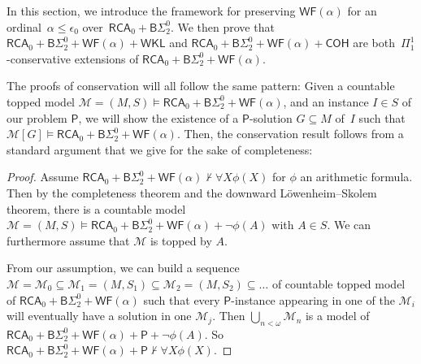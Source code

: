 \documentclass{article}
\newtheorem{theorem}{Theorem}
\numberwithin{theorem}{section}
\newtheorem{definition}[theorem]{Definition}
\newcommand{\quentin}[1]{\textcolor{green}{#1}}
\newcommand{\RCA}{\mathsf{RCA}}
\newcommand{\WKL}{\mathsf{WKL}}
\newcommand{\EM}{\mathsf{EM}}
\newcommand{\ADS}{\mathsf{ADS}}
\newcommand{\COH}{\mathsf{COH}}
\newcommand{\BSig}{\mathsf{B}\Sigma^0}
\newcommand{\WF}{\mathsf{WF}}
\newcommand{\RT}{\mathsf{RT}}
\newcommand{\M}{\mathcal{M}}
\newcommand{\NN}{\mathbb{N}}
\begin{document}
In this section, we introduce the framework for preserving $\WF(\alpha)$ for an ordinal~$\alpha \leq \epsilon_0$ over~$\RCA_0 + \BSig_2$. We then prove that $\RCA_0 + \BSig_2 + \WF(\alpha) + \WKL$ and $\RCA_0 + \BSig_2 + \WF(\alpha) + \COH$ are both~$\Pi^1_1$-conservative extensions of $\RCA_0 + \BSig_2 + \WF(\alpha)$.

The proofs of conservation will all follow the same pattern: Given a countable topped model  $\M = (M,S) \models \RCA_0 + \BSig_2 + \WF(\alpha)$, and an instance $I \in S$ of our problem $\mathsf{P}$, we will show the existence of a $\mathsf{P}$-solution $G \subseteq M$ of~$I$ such that $\M[G] \models \RCA_0 + \BSig_2 + \WF(\alpha)$. Then, the conservation result follows from a standard argument that we give for the sake of completeness:




\begin{proof}
Assume $\RCA_0 + \BSig_2 + \WF(\alpha) \not \vdash \forall X \phi(X)$ for $\phi$ an arithmetic formula. Then by the completeness theorem and the downward Löwenheim–Skolem theorem, there is a countable model $\M = (M,S) \models \RCA_0 + \BSig_2 + \WF(\alpha) + \neg \phi(A)$ with $A \in S$. We can furthermore assume that $\M$ is topped by $A$.

From our assumption, we can build a sequence $\M = \M_0 \subseteq \M_1 = (M,S_1) \subseteq \M_2 = (M,S_2) \subseteq \dots$ of countable topped model of $\RCA_0 + \BSig_2 + \WF(\alpha)$ such that every $\mathsf{P}$-instance appearing in one of the $\M_i$ will eventually have a solution in one $\M_j$. Then $\bigcup_{n < \omega} \M_n$ is a model of $\RCA_0 + \BSig_2 + \WF(\alpha) + \mathsf{P} + \neg \phi(A)$. So $\RCA_0 + \BSig_2 + \WF(\alpha) + \mathsf{P} \not \vdash \forall X \phi(X)$.
\end{proof}
\end{document}
